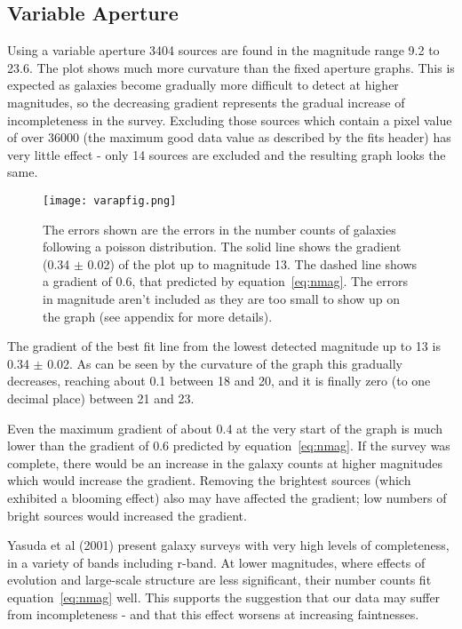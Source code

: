 \documentclass[a4paper,11pt,twoside]{article}
\begin{document}
\newpage
\subsection{Variable Aperture}

Using a variable aperture 3404 sources are found in the
magnitude range 9.2 to 23.6.
The plot shows much more curvature 
than the fixed aperture graphs. This is expected as galaxies 
become gradually more difficult to detect at higher magnitudes, 
so the decreasing gradient represents the gradual increase of 
incompleteness in the survey. Excluding those sources which 
contain a pixel value of over 36000 (the maximum good data 
value as described by the fits header) has very little 
effect - only 14 sources are excluded and the resulting graph 
looks the same.

\begin{figure}[htb]
  \centering
  \texttt{[image: varapfig.png]}
  \caption{The errors shown are the errors in the number 
counts of galaxies following a poisson distribution. The solid line
shows the gradient (0.34 \(\pm\) 0.02) of the plot up to 
magnitude 13. The dashed line shows a gradient of 0.6, that 
predicted by equation~\ref{eq:nmag}. 
The errors in magnitude aren't included as 
they are too small to show up on the graph 
(see appendix for more details).}
  \label{fig:varapfig}
\end{figure}


The gradient of the best fit line from the lowest detected 
magnitude up to 13 is 0.34 \(\pm\) 0.02. 
As can be seen by the curvature of the 
graph this gradually decreases, reaching about 0.1 between 
18 and 20, and it is finally zero (to one decimal place) 
between 21 and 23. 

Even the maximum gradient of about 0.4 at the very start 
of the graph is much lower than the gradient of 0.6 
predicted by equation~\ref{eq:nmag}. If the survey was complete, 
there would be an increase in the galaxy counts at higher magnitudes 
which would increase the gradient. Removing the brightest 
sources (which exhibited a blooming effect) also may have 
affected the gradient; low numbers of bright sources would  
increased the gradient.

Yasuda\cite{yasuda} et al (2001) present galaxy surveys with 
very high levels of completeness, in a variety of bands including 
r-band. At lower magnitudes, where effects of evolution and 
large-scale structure are less significant, their number 
counts fit equation~\ref{eq:nmag} well. This supports the suggestion 
that our data may suffer from incompleteness - and that this 
effect worsens at increasing faintnesses. 
\end{document}
